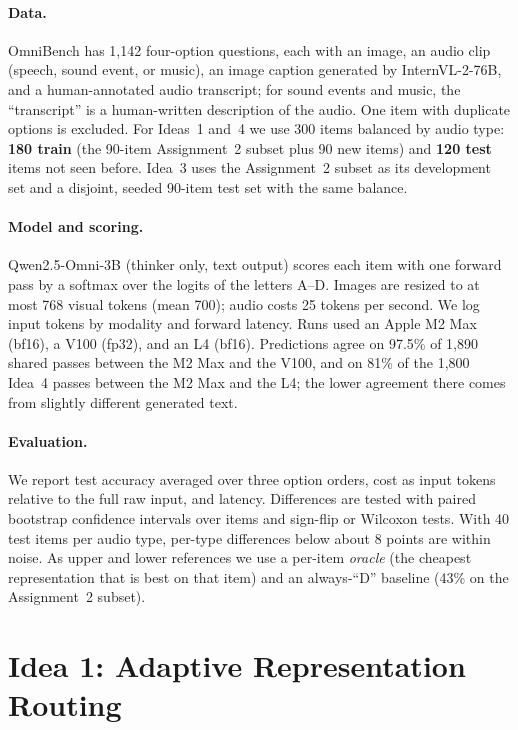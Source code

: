 \documentclass{article}
\begin{document}
\paragraph{Data.} OmniBench has 1,142 four-option questions, each with an image, an
audio clip (speech, sound event, or music), an image caption generated by
InternVL-2-76B, and a human-annotated audio transcript; for sound events and music,
the ``transcript'' is a human-written description of the audio. One item with duplicate options is excluded. For Ideas~1 and~4 we use
300 items balanced by audio type: \textbf{180 train} (the 90-item Assignment~2
subset plus 90 new items) and \textbf{120 test} items not seen before. Idea~3 uses
the Assignment~2 subset as its development set and a disjoint, seeded 90-item test
set with the same balance.

\paragraph{Model and scoring.} Qwen2.5-Omni-3B (thinker only, text output) scores
each item with one forward pass by a softmax over the logits of the letters A--D.
Images are resized to at most 768 visual tokens (mean 700); audio costs 25 tokens
per second. We log input tokens by modality and forward latency. Runs used an Apple
M2 Max (bf16), a V100 (fp32), and an L4 (bf16). Predictions agree on 97.5\% of
1,890 shared passes between the M2 Max and the V100, and on 81\% of the 1,800
Idea~4 passes between the M2 Max and the L4; the lower agreement there comes from
slightly different generated text.

\paragraph{Evaluation.} We report test accuracy averaged over three option orders,
cost as input tokens relative to the full raw input, and latency. Differences are
tested with paired bootstrap confidence intervals over items and sign-flip or
Wilcoxon tests. With 40 test items per audio type, per-type differences below about
8 points are within noise. As upper and lower references we use a per-item
\emph{oracle} (the cheapest representation that is best on that item) and an
always-``D'' baseline (43\% on the Assignment~2 subset).

\section{Idea 1: Adaptive Representation Routing}
\label{sec:idea1}
\end{document}
